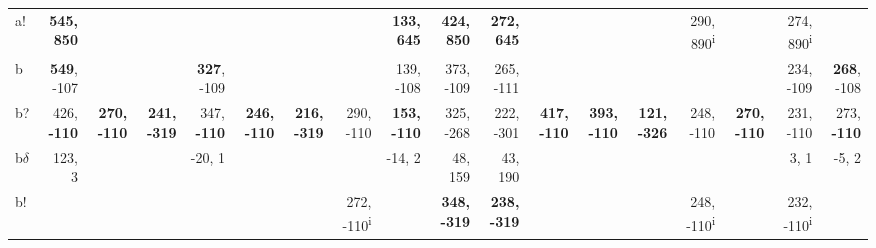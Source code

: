 \begin{table}[p]
{\begin{tabular}{lrrrrrrrrrrrrrrrrr}
a! & \textbf{545, 850} &  &  &  &  &  &  & \textbf{133, 645} & \textbf{424, 850} & \textbf{272, 645} &  &  &  & 290, 890\textsuperscript{i} &  & 274, 890\textsuperscript{i} &  \\
b & \textbf{549}, -107 &  &  & \textbf{327}, -109 &  &  &  & 139, -108 & 373, -109 & 265, -111 &  &  &  &  &  & 234, -109 & \textbf{268}, -108 \\
b? & 426, \textbf{-110} & \textbf{270, -110} & \textbf{241, -319} & 347, \textbf{-110} & \textbf{246, -110} & \textbf{216, -319} & 290, -110 & \textbf{153, -110} & 325, -268 & 222, -301 & \textbf{417, -110} & \textbf{393, -110} & \textbf{121, -326} & 248, -110 & \textbf{270, -110} & 231, -110 & 273, \textbf{-110} \\
b$\delta$ & 123, 3 &  &  & -20, 1 &  &  &  & -14, 2 & 48, 159 & 43, 190 &  &  &  &  &  & 3, 1 & -5, 2 \\
b! &  &  &  &  &  &  & 272, -110\textsuperscript{i} &  & \textbf{348, -319} & \textbf{238, -319} &  &  &  & 248, -110\textsuperscript{i} &  & 232, -110\textsuperscript{i} &  \\

\end{tabular}
}
\end{table}
\clearpage


